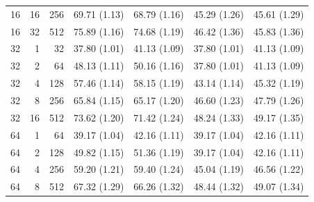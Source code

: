 \documentclass[11pt,letterpaper]{article}
\begin{document}
\begin{table}[p]
\begin{tabular}{@{}rrr rrrr@{}}
16 & 16 & 256 & 69.71 {\scriptsize (1.13)} & 68.79 {\scriptsize (1.16)} & 45.29 {\scriptsize (1.26)} & 45.61 {\scriptsize (1.29)} \\
16 & 32 & 512 & 75.89 {\scriptsize (1.16)} & 74.68 {\scriptsize (1.19)} & 46.42 {\scriptsize (1.36)} & 45.83 {\scriptsize (1.36)} \\
\midrule
32 & 1 & 32 & 37.80 {\scriptsize (1.01)} & 41.13 {\scriptsize (1.09)} & 37.80 {\scriptsize (1.01)} & 41.13 {\scriptsize (1.09)} \\
32 & 2 & 64 & 48.13 {\scriptsize (1.11)} & 50.16 {\scriptsize (1.16)} & 37.80 {\scriptsize (1.01)} & 41.13 {\scriptsize (1.09)} \\
32 & 4 & 128 & 57.46 {\scriptsize (1.14)} & 58.15 {\scriptsize (1.19)} & 43.14 {\scriptsize (1.14)} & 45.32 {\scriptsize (1.19)} \\
32 & 8 & 256 & 65.84 {\scriptsize (1.15)} & 65.17 {\scriptsize (1.20)} & 46.60 {\scriptsize (1.23)} & 47.79 {\scriptsize (1.26)} \\
32 & 16 & 512 & 73.62 {\scriptsize (1.20)} & 71.42 {\scriptsize (1.24)} & 48.24 {\scriptsize (1.33)} & 49.17 {\scriptsize (1.35)} \\
\midrule
64 & 1 & 64 & 39.17 {\scriptsize (1.04)} & 42.16 {\scriptsize (1.11)} & 39.17 {\scriptsize (1.04)} & 42.16 {\scriptsize (1.11)} \\
64 & 2 & 128 & 49.82 {\scriptsize (1.15)} & 51.36 {\scriptsize (1.19)} & 39.17 {\scriptsize (1.04)} & 42.16 {\scriptsize (1.11)} \\
64 & 4 & 256 & 59.20 {\scriptsize (1.21)} & 59.40 {\scriptsize (1.24)} & 45.04 {\scriptsize (1.19)} & 46.56 {\scriptsize (1.22)} \\
64 & 8 & 512 & 67.32 {\scriptsize (1.29)} & 66.26 {\scriptsize (1.32)} & 48.44 {\scriptsize (1.32)} & 49.07 {\scriptsize (1.34)} \\
\bottomrule
\end{tabular}
\end{table}
\end{document}
